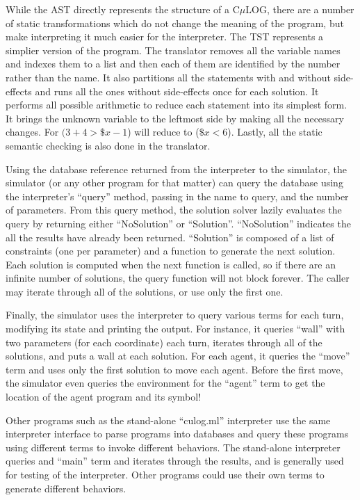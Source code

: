 \documentclass[onecolumn,titlepage]{article}
\begin{document}
While the AST directly represents the structure of a C$\mu$LOG, there
are a number of static transformations which do not change the meaning
of the program, but make interpreting it much easier for the
interpreter.  The TST represents a simplier version of the program.
The translator removes all the variable names and indexes them to a
list and then each of them are identified by the number rather than
the name.  It also partitions all the statements with and without
side-effects and runs all the ones without side-effects once for each
solution. It performs all possible arithmetic to reduce each statement
into its simplest form. It brings the unknown variable to the leftmost
side by making all the necessary changes. For $(3+4>\$x-1$) will
reduce to ($\$x<6$). Lastly, all the static semantic checking is also
done in the translator.

Using the database reference returned from the interpreter to the
simulator, the simulator (or any other program for that matter) can
query the database using the interpreter's ``query'' method, passing
in the name to query, and the number of parameters.  From this query
method, the solution solver lazily evaluates the query by returning
either ``NoSolution'' or ``Solution''.  ``NoSolution'' indicates the
all the results have already been returned.  ``Solution'' is composed
of a list of constraints (one per parameter) and a function to
generate the next solution.  Each solution is computed when the next
function is called, so if there are an infinite number of solutions,
the query function will not block forever.  The caller may iterate
through all of the solutions, or use only the first one.

Finally, the simulator uses the interpreter to query various terms for
each turn, modifying its state and printing the output.  For instance,
it queries ``wall'' with two parameters (for each coordinate) each
turn, iterates through all of the solutions, and puts a wall at each
solution.  For each agent, it queries the ``move'' term and uses only
the first solution to move each agent.  Before the first move, the
simulator even queries the environment for the ``agent'' term to get
the location of the agent program and its symbol!

Other programs such as the stand-alone ``culog.ml'' interpreter use
the same interpreter interface to parse programs into databases and
query these programs using different terms to invoke different
behaviors.  The stand-alone interpreter queries and ``main'' term and
iterates through the results, and is generally used for testing of the
interpreter.  Other programs could use their own terms to generate
different behaviors.
\end{document}
